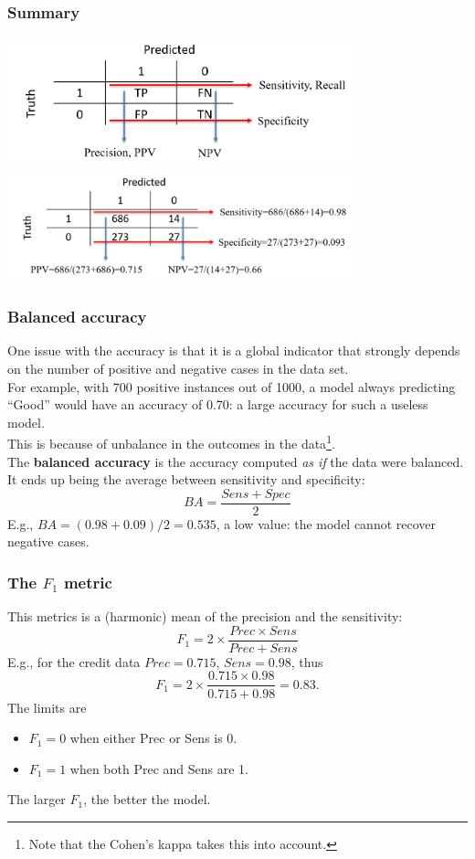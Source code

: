\begin{frame}
\frametitle{Summary}
\begin{center}
\includegraphics[width=10cm]{../Graphs/CondProb.png}\\
\includegraphics[width=10cm]{../Graphs/CondProb_example.png}\\
\end{center}
\end{frame}
\begin{frame}
\frametitle{Balanced accuracy}
One issue with the accuracy is that it is a global indicator that strongly depends on the number of positive and negative cases in the data set.\\
\vspace{0.2cm}
For example, with 700 positive instances out of 1000, a model always predicting ``Good'' would have an accuracy of 0.70: a large accuracy for such a useless model.\\
\vspace{0.2cm}
This is because of unbalance in the outcomes in the data\footnote{Note that the Cohen's kappa takes this into account.}.\\
\vspace{0.3cm} 
The {\bf balanced accuracy} is the accuracy computed {\it as if} the data were balanced. It ends up being the average between sensitivity and specificity:
$$
BA = \frac{Sens+Spec}{2}
$$
E.g., $BA=(0.98+0.09)/2=0.535$, a low value: the model cannot recover negative cases.
\end{frame}
\begin{frame}
\frametitle{The $F_1$ metric}
This metrics is a (harmonic) mean of the precision and the sensitivity:
$$
F_1 = 2 \times \frac{Prec\times Sens}{Prec+Sens}
$$
E.g., for the credit data $Prec = 0.715$, $Sens = 0.98$, thus
$$
F_1 = 2 \times\frac{0.715\times 0.98}{0.715+0.98} = 0.83.
$$
The limits are 
\begin{itemize}
\item $F_1 = 0$ when either Prec or Sens is 0. 
\item $F_1 = 1$ when both Prec and Sens are 1. 
\end{itemize}
The larger $F_1$, the better the model.
\end{frame}
